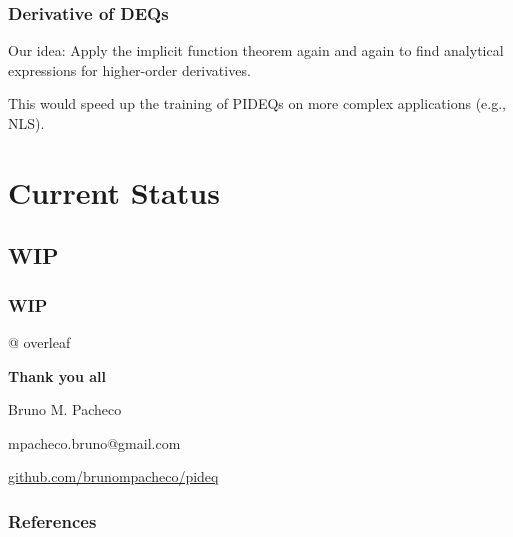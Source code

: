 \documentclass[t]{beamer}
\begin{document}
\begin{frame}
    \frametitle{Derivative of DEQs}
    Our idea: Apply the implicit function theorem again and again to find analytical expressions for higher-order derivatives.
    \vfill

    This would speed up the training of PIDEQs on more complex applications (e.g., NLS).
\end{frame}

\section{Current Status}

\subsection{WIP}

\begin{frame}
    \frametitle{WIP}
    \vfill
    @ overleaf
    \vfill
\end{frame}


{
\begin{frame}
\vspace{15mm}
\begin{center}
\textcolor{cinza}{
\textbf{Thank you all}
}
\end{center}
\vspace{-6mm}
\begin{center}
\textcolor{cinza}{\scriptsize{
	Bruno M. Pacheco
}}
\end{center}
\vspace{-6mm}
\begin{center}
\textcolor{cinza}{\scriptsize{
mpacheco.bruno@gmail.com
}}
\end{center}
\vspace{-6mm}
\begin{center}
\textcolor{cinza}{\scriptsize{
\href{https://github.com/brunompacheco/pideq}{github.com/brunompacheco/pideq}
}}
\end{center}
\end{frame}
}

\begin{frame}
    \frametitle{References}
    \printbibliography
\end{frame}
\end{document}
